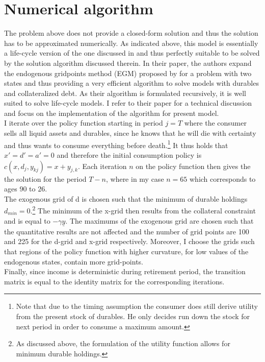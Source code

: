 \documentclass[12pt,a4paper,leqno]{article}
\theoremstyle{definition}
\begin{document}
\section{Numerical algorithm}

The problem above does not provide a closed-form solution and thus the solution has to be approximated numerically. As indicated above, this model is essentially a life-cycle version of the one discussed in \cite{hintermaier2010} and thus perfectly suitable to be solved by the solution algorithm discussed therein. In their paper, the authors expand the endogenous gridpoints method (EGM) proposed by \cite{carroll2006} for a problem with two states and thus providing a very efficient algorithm to solve models with durables and collateralized debt. As their algorithm is formulated recursively, it is well suited to solve life-cycle models. I refer to their paper for a technical discussion and focus on the implementation of the algorithm for present model.\\
I iterate over the policy function starting in period $j = T$ where the consumer sells all liquid assets and durables, since he knows that he will die with certainty and thus wants to consume everything before death.\footnote{Note that due to the timing assumption the consumer does still derive utility from the present stock of durables. He only decides run down the stock for next period in order to consume a maximum amount.} It thus holds that $x'=d'=a'=0$ and therefore the initial consumption policy is $c(x,d_{j},y_{kj})=x+y_{j,k}$. Each iteration $n$ on the policy function then gives the the solution for the period $T-n$, where in my case $n=65$ which corresponds to ages $90$ to $26$. \\
The exogenous grid of d is chosen such that the minimum of durable holdings $d_{min} = 0$.\footnote{As discussed above, the formulation of the utility function allows for minimum durable holdings.} The minimum of the x-grid then results from the collateral constraint and is equal to $-\gamma\underline{y}$. The maximums of the exogenous grid are chosen such that the quantitative results are not affected and the number of grid points are 100 and 225 for the d-grid and x-grid respectively. Moreover, I choose the grids such that regions of the policy function with higher curvature, for low values of the endogenous states, contain more grid-points.\\
Finally, since income is deterministic during retirement period, the transition matrix is equal to the identity matrix for the corresponding iterations.
\end{document}
